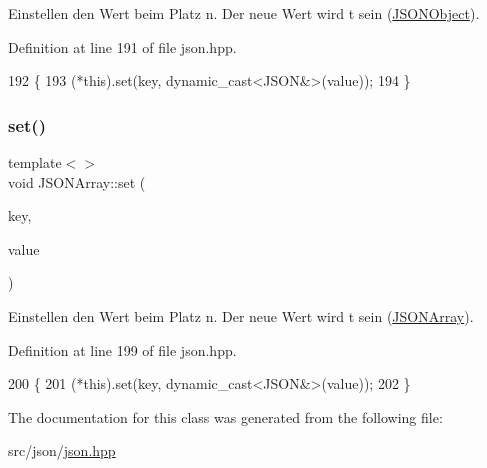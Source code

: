 Einstellen den Wert beim Platz n. Der neue Wert wird t sein (\mbox{\hyperlink{class_j_s_o_n_object}{J\+S\+O\+N\+Object}}). 

Definition at line 191 of file json.\+hpp.


\begin{DoxyCode}
192 \{
193     (*this).set(key, dynamic\_cast<JSON&>(value));
194 \}
\end{DoxyCode}
\mbox{\label{class_j_s_o_n_array_adabcf6ff104db56de01192e17f488aed}} 
\subsubsection{\texorpdfstring{set()}{set()}\hspace{0.1cm}{\footnotesize\ttfamily [4/4]}}
{\footnotesize\ttfamily template$<$$>$ \\
void J\+S\+O\+N\+Array\+::set (\begin{DoxyParamCaption}\item[{int}]{key,  }\item[{\mbox{\hyperlink{class_j_s_o_n_array}{J\+S\+O\+N\+Array}}}]{value }\end{DoxyParamCaption})\hspace{0.3cm}{\ttfamily [inline]}}

Einstellen den Wert beim Platz n. Der neue Wert wird t sein (\mbox{\hyperlink{class_j_s_o_n_array}{J\+S\+O\+N\+Array}}). 

Definition at line 199 of file json.\+hpp.


\begin{DoxyCode}
200 \{
201     (*this).set(key, dynamic\_cast<JSON&>(value));
202 \}
\end{DoxyCode}


The documentation for this class was generated from the following file\+:\begin{DoxyCompactItemize}
\item 
src/json/\mbox{\hyperlink{src_2json_2json_8hpp}{json.\+hpp}}\end{DoxyCompactItemize}
